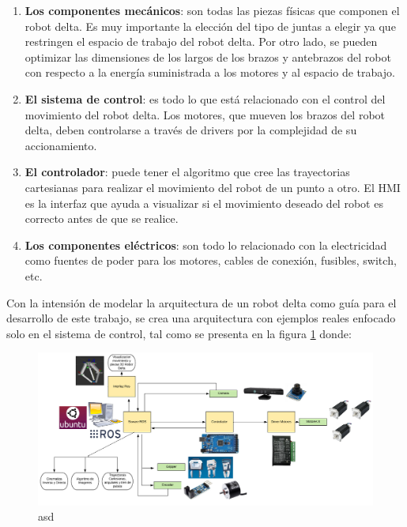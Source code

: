     \begin{enumerate}
        \item{ \textbf{Los componentes mecánicos}: son todas las piezas físicas que componen el robot delta. Es muy importante la elección del tipo de juntas a elegir ya que restringen el espacio de trabajo del robot delta. Por otro lado, se pueden optimizar las dimensiones de los largos de los brazos y antebrazos del robot con respecto a la energía suministrada a los motores y al espacio de trabajo.}
        \item{\textbf{El sistema de control}: es todo lo que está relacionado con el control del movimiento del robot delta. Los motores, que mueven los brazos del robot delta, deben controlarse a través de drivers por la complejidad de su accionamiento.}
        \item{ \textbf{El controlador}: puede tener el algoritmo que cree las trayectorias cartesianas para realizar el movimiento del robot de un punto a otro. El HMI es la interfaz que ayuda a visualizar si el movimiento deseado del robot es correcto antes de que se realice.}
        \item{   \textbf{Los componentes eléctricos}: son todo lo relacionado con la electricidad como fuentes de poder para los motores, cables de conexión, fusibles, switch, etc.}
    \end{enumerate}

        \newpage

    Con la intensión de modelar la arquitectura de un robot delta como guía para el desarrollo de este trabajo, se crea una arquitectura con ejemplos reales enfocado solo en el sistema de control, tal como se presenta en la figura \ref{f:Cap3-2_esquema_sistema_control} donde:

    \begin{figure}[h]
        \centering
        \includegraphics[width=1\linewidth]{Main/Chapter3/Images3/3-2/sistema-de-control.png}
        \caption{asd}
        \label{f:Cap3-2_esquema_sistema_control}
    \end{figure}
    
